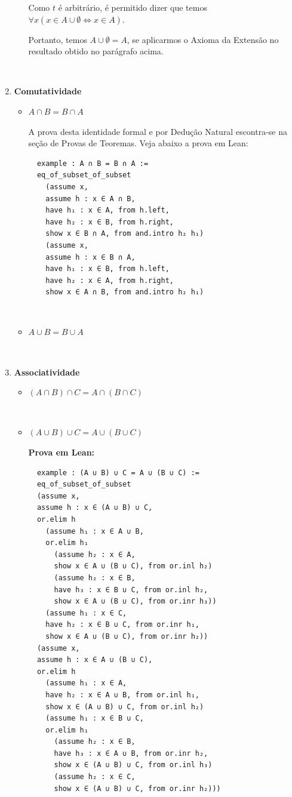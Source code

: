 \begin{enumerate}
\begin{itemize}
Como $t$ é arbitrário, é permitido dizer que temos $\forall x (x \in A \cup \emptyset \iff x \in A) $.

Portanto, temos $A \cup \emptyset = A$, se aplicarmos o Axioma da Extensão no resultado obtido no parágrafo acima.
\end{itemize}

$\qquad$

\item{\textbf{Comutatividade}}
\begin{itemize}
\item $A \cap B = B \cap A$ 

A prova desta identidade formal e por Dedução Natural escontra-se na seção de Provas de Teoremas. Veja abaixo a prova em Lean:

\begin{lstlisting}
  example : A ∩ B = B ∩ A :=
  eq_of_subset_of_subset
    (assume x,
    assume h : x ∈ A ∩ B,
    have h₁ : x ∈ A, from h.left,
    have h₂ : x ∈ B, from h.right,
    show x ∈ B ∩ A, from and.intro h₂ h₁)
    (assume x,
    assume h : x ∈ B ∩ A,
    have h₁ : x ∈ B, from h.left,
    have h₂ : x ∈ A, from h.right,
    show x ∈ A ∩ B, from and.intro h₂ h₁)
\end{lstlisting}

$\qquad$

\item $A \cup B = B \cup A$
\end{itemize}

$\qquad$

\item{\textbf{Associatividade}}
\begin{itemize}
\item $(A \cap B) \cap C = A \cap (B \cap C)$

$\qquad$

\item $(A \cup B) \cup C = A \cup (B \cup C)$

\textbf{Prova em Lean:}

\begin{lstlisting}
  example : (A ∪ B) ∪ C = A ∪ (B ∪ C) :=
  eq_of_subset_of_subset
  (assume x,
  assume h : x ∈ (A ∪ B) ∪ C,
  or.elim h
    (assume h₁ : x ∈ A ∪ B,
    or.elim h₁
      (assume h₂ : x ∈ A,
      show x ∈ A ∪ (B ∪ C), from or.inl h₂)
      (assume h₂ : x ∈ B,
      have h₃ : x ∈ B ∪ C, from or.inl h₂,
      show x ∈ A ∪ (B ∪ C), from or.inr h₃))
    (assume h₁ : x ∈ C,
    have h₂ : x ∈ B ∪ C, from or.inr h₁,
    show x ∈ A ∪ (B ∪ C), from or.inr h₂))
  (assume x,
  assume h : x ∈ A ∪ (B ∪ C),
  or.elim h
    (assume h₁ : x ∈ A,
    have h₂ : x ∈ A ∪ B, from or.inl h₁,
    show x ∈ (A ∪ B) ∪ C, from or.inl h₂)
    (assume h₁ : x ∈ B ∪ C,
    or.elim h₁
      (assume h₂ : x ∈ B,
      have h₃ : x ∈ A ∪ B, from or.inr h₂,
      show x ∈ (A ∪ B) ∪ C, from or.inl h₃)
      (assume h₂ : x ∈ C,
      show x ∈ (A ∪ B) ∪ C, from or.inr h₂))) \end{lstlisting}
\end{itemize}


\end{enumerate}
